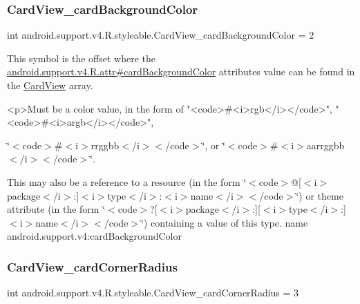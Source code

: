 \subsubsection{\texorpdfstring{Card\+View\+\_\+card\+Background\+Color}{CardView\_cardBackgroundColor}}
{\footnotesize\ttfamily int android.\+support.\+v4.\+R.\+styleable.\+Card\+View\+\_\+card\+Background\+Color = 2\hspace{0.3cm}{\ttfamily [static]}}

This symbol is the offset where the \hyperlink{classandroid_1_1support_1_1v4_1_1R_1_1attr_acf5b55e359835fbeba6ee324667289c7}{android.\+support.\+v4.\+R.\+attr\#card\+Background\+Color} attribute\textquotesingle{}s value can be found in the \hyperlink{classandroid_1_1support_1_1v4_1_1R_1_1styleable_a0e520cd4c78beb0d456e4018c4ba0e86}{Card\+View} array.

\begin{DoxyVerb}      <p>Must be a color value, in the form of "<code>#<i>rgb</i></code>", "<code>#<i>argb</i></code>",
\end{DoxyVerb}
 \char`\"{}$<$code$>$\#$<$i$>$rrggbb$<$/i$>$$<$/code$>$\char`\"{}, or \char`\"{}$<$code$>$\#$<$i$>$aarrggbb$<$/i$>$$<$/code$>$\char`\"{}. 

This may also be a reference to a resource (in the form \char`\"{}$<$code$>$@\mbox{[}$<$i$>$package$<$/i$>$\+:\mbox{]}$<$i$>$type$<$/i$>$\+:$<$i$>$name$<$/i$>$$<$/code$>$\char`\"{}) or theme attribute (in the form \char`\"{}$<$code$>$?\mbox{[}$<$i$>$package$<$/i$>$\+:\mbox{]}\mbox{[}$<$i$>$type$<$/i$>$\+:\mbox{]}$<$i$>$name$<$/i$>$$<$/code$>$\char`\"{}) containing a value of this type.  name android.\+support.\+v4\+:card\+Background\+Color \mbox{\label{classandroid_1_1support_1_1v4_1_1R_1_1styleable_afbb158deb29f5a8054222a96fe5359de}} 
\subsubsection{\texorpdfstring{Card\+View\+\_\+card\+Corner\+Radius}{CardView\_cardCornerRadius}}
{\footnotesize\ttfamily int android.\+support.\+v4.\+R.\+styleable.\+Card\+View\+\_\+card\+Corner\+Radius = 3\hspace{0.3cm}{\ttfamily [static]}}

